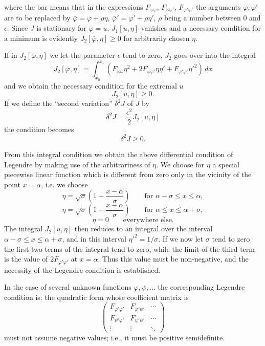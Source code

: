 where the bar means that in the expressions $F_{\varphi\varphi}$, $F_{\varphi\varphi'}$, $F_{\varphi'\varphi'}$ the arguments $\varphi,\varphi'$ are to be replaced by $\bar\varphi=\varphi+\rho\eta$, $\bar\varphi'=\varphi'+\rho\eta'$, $\rho$ being a number between $0$ and $\epsilon$. Since $J$ is stationary for $\varphi=u$, $J_1[u,\eta]$ vanishes and a necessary condition for a minimum is evidently $J_2[\bar\varphi,\eta]\ge0$ for arbitrarily chosen $\eta$.

If in $J_2[\bar\varphi,\eta]$ we let the parameter $\epsilon$ tend to zero, $J_2$ goes over into the integral
\[
J_2[\varphi,\eta]
=\int_{x_0}^{x_1}
\left(F_{\varphi\varphi}\eta^2+2F_{\varphi\varphi'}\eta\eta'
+F_{\varphi'\varphi'}\eta'^2\right)\,dx
\]
and we obtain the necessary condition for the extremal $u$
\[
J_2[u,\eta]\ge0.
\]
If we define the ``second variation'' $\delta^2J$ of $J$ by
\[
\delta^2J=\frac{\epsilon^2}{2}J_2[u,\eta]
\]
the condition becomes
\[
\delta^2J\ge0.
\]

From this integral condition we obtain the above differential condition of Legendre by making use of the arbitrariness of $\eta$. We choose for $\eta$ a special piecewise linear function which is different from zero only in the vicinity of the point $x=\alpha$, i.e. we choose
\[
\eta=\sqrt{\sigma}\left(1+\frac{x-\alpha}{\sigma}\right)
\qquad\text{for }\alpha-\sigma\le x\le\alpha,
\]
\[
\eta=\sqrt{\sigma}\left(1-\frac{x-\alpha}{\sigma}\right)
\qquad\text{for }\alpha\le x\le\alpha+\sigma,
\]
\[
\eta=0\qquad\text{everywhere else.}
\]
The integral $J_2[u,\eta]$ then reduces to an integral over the interval $\alpha-\sigma\le x\le\alpha+\sigma$, and in this interval $\eta'^2=1/\sigma$. If we now let $\sigma$ tend to zero the first two terms of the integral tend to zero, while the limit of the third term is the value of $2F_{\varphi'\varphi'}$ at $x=\alpha$. Thus this value must be non-negative, and the necessity of the Legendre condition is established.

In the case of several unknown functions $\varphi,\psi,\ldots$ the corresponding Legendre condition is: the quadratic form whose coefficient matrix is
\[
\begin{pmatrix}
F_{\varphi'\varphi'}&F_{\varphi'\psi'}&\cdots\\
F_{\psi'\varphi'}&F_{\psi'\psi'}&\cdots\\
\vdots&\vdots&\ddots
\end{pmatrix}
\]
must not assume negative values; i.e., it must be positive semidefinite.

